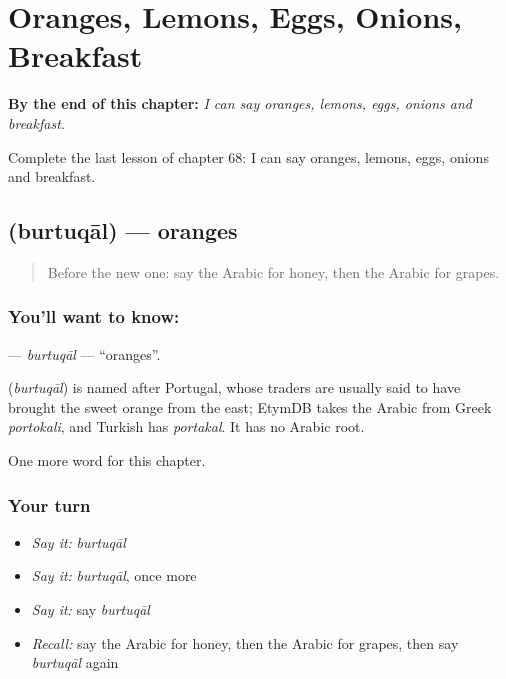 
\chapter{Oranges, Lemons, Eggs, Onions, Breakfast}
\label{ch:ar-oranges-lemons-eggs-onions-breakfast}

\begin{chapteropening}
\textbf{By the end of this chapter:} \emph{I can say oranges, lemons, eggs, onions and breakfast.}

Complete the last lesson of chapter 68: I can say oranges, lemons, eggs, onions and breakfast.
\end{chapteropening}

\section[\texorpdfstring{\ar{برتقال} (burtuqāl)}{برتقال (burtuqāl)}]{ (burtuqāl) — oranges}

\label{lesson:AR-C68-burtuqal}



\begin{quote}
Before the new one: say the Arabic for honey, then the Arabic for grapes.
\end{quote}

\subsection*{You'll want to know: }
\textbf{} — \emph{burtuqāl} — \textquotedblleft{}oranges\textquotedblright{}.

\begin{cousinweb}
\textbf{} (\emph{burtuqāl}) is named after Portugal, whose traders are usually said to have brought the sweet orange from the east; EtymDB takes the Arabic from Greek \emph{portokali}, and Turkish has \emph{portakal}. It has no Arabic root.
\end{cousinweb}

\begin{grammarlens}[title={What you've built}]
One more word for this chapter.
\end{grammarlens}

\subsection*{Your turn}
\begin{itemize}
\raggedright
  \item \emph{Say it:} \emph{burtuqāl}
  \item \emph{Say it:} \emph{burtuqāl}, once more
  \item \emph{Say it:} say \emph{burtuqāl}
  \item \emph{Recall:} say the Arabic for honey, then the Arabic for grapes, then say \emph{burtuqāl} again
\end{itemize}

